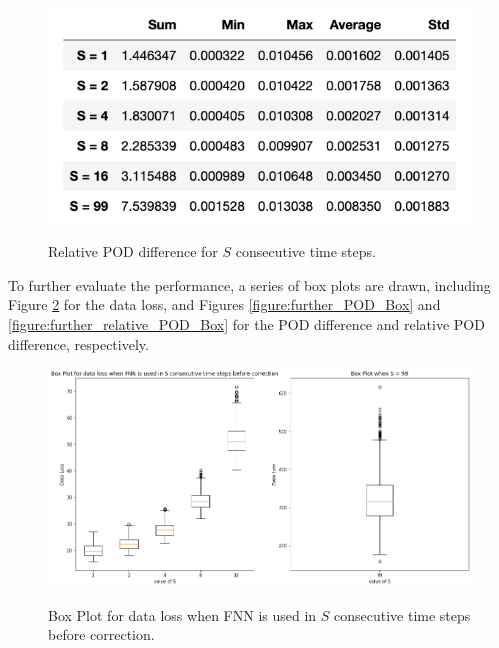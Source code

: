 \begin{figure}[H]
    \caption{Relative POD difference for $S$ consecutive time steps.}
    \includegraphics[scale=0.7]{figures/mantle_convection_images/further_testings/Relative_POD_table.png}
    \label{figure:further_relative_POD}
\end{figure}

To further evaluate the performance, a series of box plots are drawn, including Figure \ref{figure:further_loss_Box} for the data loss, and Figures \ref{figure:further_POD_Box} and \ref{figure:further_relative_POD_Box} for the POD difference and relative POD difference, respectively.

\begin{figure}[H]
    \caption{Box Plot for data loss when FNN is used in $S$ consecutive time steps before correction.}
    \includegraphics[scale=0.4]{figures/mantle_convection_images/further_testings/Data_Loss_boxplot.png}
    \label{figure:further_loss_Box}
\end{figure}

